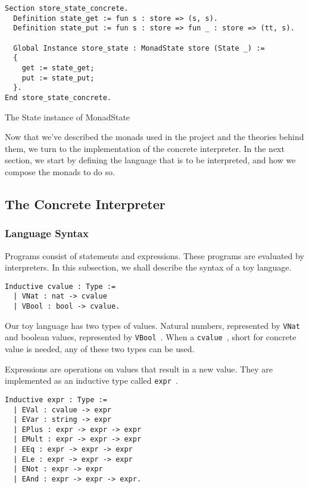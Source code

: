 \begin{listing}
\begin{verbatim}
Section store_state_concrete.
  Definition state_get := fun s : store => (s, s).
  Definition state_put := fun s : store => fun _ : store => (tt, s).

  Global Instance store_state : MonadState store (State _) :=
  {
    get := state_get;
    put := state_put;
  }.
End store_state_concrete.
\end{verbatim}
\caption{The State instance of MonadState}
\label{lst:monadstate_state}
\end{listing}

Now that we've described the monads used in the project and the 
theories behind them, we turn to the implementation of the concrete
interpreter. In the next section, we start by defining the language that is to
be interpreted, and how we compose the monads to do so.

\subsection{The Concrete Interpreter}

\subsubsection{Language Syntax}
\label{sec:lang}
Programs consist of statements and expressions. These programs are evaluated by
interpreters. In this subsection, we shall describe the syntax of a toy
language.

\begin{listing}
\begin{verbatim}
Inductive cvalue : Type :=
  | VNat : nat -> cvalue
  | VBool : bool -> cvalue.
\end{verbatim}
\end{listing}

Our toy language has two types of values. Natural numbers, represented by
\texttt{VNat } and boolean values, represented by \texttt{VBool }. 
When a \texttt{cvalue }, short for concrete value is needed, any of
these two types can be used.

Expressions are operations on values that result in a new value. They are
implemented as an inductive type called \texttt{expr }. 

\begin{listing}
\begin{verbatim}
Inductive expr : Type :=
  | EVal : cvalue -> expr
  | EVar : string -> expr
  | EPlus : expr -> expr -> expr
  | EMult : expr -> expr -> expr
  | EEq : expr -> expr -> expr
  | ELe : expr -> expr -> expr
  | ENot : expr -> expr
  | EAnd : expr -> expr -> expr.
\end{verbatim}
\end{listing}

